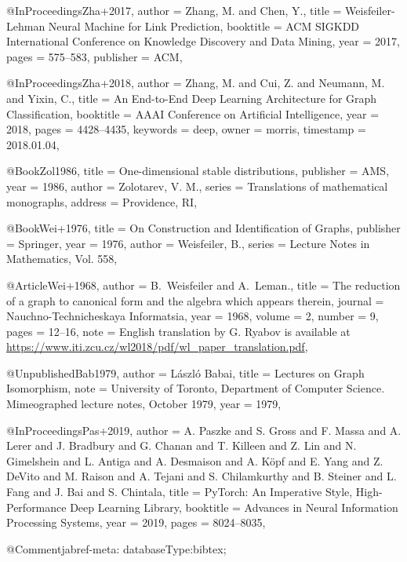 @InProceedings{Zha+2017,
  author    = {Zhang, M. and Chen, Y.},
  title     = {{Weisfeiler-Lehman} Neural Machine for Link Prediction},
  booktitle = {ACM SIGKDD International Conference on Knowledge Discovery and Data Mining},
  year      = {2017},
  pages     = {575--583},
  publisher = {ACM},
}

@InProceedings{Zha+2018,
  author    = {Zhang, M. and Cui, Z. and Neumann, M. and Yixin, C.},
  title     = {An End-to-End Deep Learning Architecture for Graph Classification},
  booktitle = {AAAI Conference on Artificial Intelligence},
  year      = {2018},
  pages     = {4428--4435},
  keywords  = {deep},
  owner     = {morris},
  timestamp = {2018.01.04},
}

@Book{Zol1986,
  title     = {One-dimensional stable distributions},
  publisher = {{AMS}},
  year      = {1986},
  author    = {Zolotarev, V. M.},
  series    = {Translations of mathematical monographs},
  address   = {Providence, RI},
}

@Book{Wei+1976,
  title     = {On Construction and Identification of Graphs},
  publisher = {Springer},
  year      = {1976},
  author    = {Weisfeiler, B.},
  series    = {Lecture Notes in Mathematics, Vol. 558},
}

@Article{Wei+1968,
  author  = {B.~Weisfeiler and A.~Leman.},
  title   = {The reduction of a graph to canonical form and the algebra which appears therein},
  journal = {Nauchno-Technicheskaya Informatsia},
  year    = {1968},
  volume  = {2},
  number  = {9},
  pages   = {12--16},
  note    = {English translation by G. Ryabov is available at \url{https://www.iti.zcu.cz/wl2018/pdf/wl_paper_translation.pdf}},
}

@Unpublished{Bab1979,
  author = {L{\'a}szl{\'o} Babai},
  title  = {Lectures on Graph Isomorphism},
  note   = {University of Toronto, Department of Computer Science. Mimeographed lecture notes, October 1979},
  year   = {1979},
}

@InProceedings{Pas+2019,
  author    = {A. Paszke and S. Gross and F. Massa and A. Lerer and J. Bradbury and G. Chanan and T. Killeen and Z. Lin and N. Gimelshein and L. Antiga and A. Desmaison and A. K{\"{o}}pf and E. Yang and Z. DeVito and M. Raison and A. Tejani and S. Chilamkurthy and B. Steiner and L. Fang and J. Bai and S. Chintala},
  title     = {{PyTorch: A}n Imperative Style, High-Performance Deep Learning Library},
  booktitle = {Advances in Neural Information Processing Systems},
  year      = {2019},
  pages     = {8024--8035},
}

@Comment{jabref-meta: databaseType:bibtex;}
